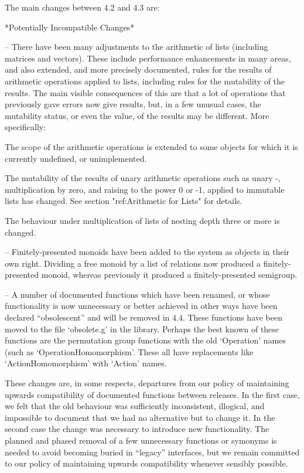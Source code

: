 The main changes between {\GAP} 4.2 and {\GAP} 4.3 are:



*Potentially Incompatible Changes*

\beginlist%

\item{--}
There have been many adjustments to the arithmetic of lists (including
matrices and vectors). These include performance enhancements in many
areas, and also extended, and more precisely documented, rules for the
results of arithmetic operations applied to lists, including rules for
the mutability of the results. The main visible consequences of this
are that a lot of operations that previously gave errors now give
results, but, in a few unusual cases, the mutability status, or even
the value, of the results may be different. More specifically:

\itemitem{\*}
    The scope of the arithmetic operations is extended to some objects for
    which it is currently undefined, or unimplemented.

\itemitem{\*}
    The mutability of the results of unary arithmetic operations such
    as unary -, multiplication by zero, and raising to the power 0 or
    -1, applied to immutable lists has changed.  See section
    "ref:Arithmetic for Lists" for details.

\itemitem{\*}
    The behaviour under multiplication of lists of nesting depth three or
    more is changed.

\item{--} Finitely-presented monoids have been added to the system as
objects in their own right.  Dividing a free monoid by a list of
relations now produced a finitely-presented monoid, whereas previously
it produced a finitely-presented semigroup. 

\item{--} A number of documented functions which have been renamed, or
whose functionality is now unnecessary or better achieved in other
ways have been declared ``obsolescent'' and will be removed in {\GAP}
4.4. These functions have been moved to the file `obsolete.g' in the
{\GAP} library. Perhaps the best known of these functions are the
permutation group functions with the old `Operation' names (such as
`OperationHomomorphism'. These all have replacements like
`ActionHomomorphism' with `Action' names.

\endlist
These changes are, in some respects, departures from our policy of
maintaining upwards compatibility of documented functions between
releases. In the first case, we felt that the old behaviour was
sufficiently inconsistent, illogical, and impossible to document that
we had no alternative but to change it. In the second case the change
was necessary to introduce new functionality. The planned and phased
removal of a few unnecessary functions or symonyms is needed to avoid
becoming buried in ``legacy'' interfaces, but we remain committed to
our policy of maintaining upwards compatibility whenever sensibly possible.


